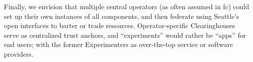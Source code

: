 Finally, we envision that multiple central operators (as often
assumed in \gls{fc}) could set up their own instances of
all components, and then federate using Seattle's open interfaces
to barter or trade resources. %
Operator-specific Clearinghouses serve as centralized trust
anchors, and ``experiments'' would rather be ``apps'' for
end users; with the former Experimenters as over-the-top service or
software providers.
